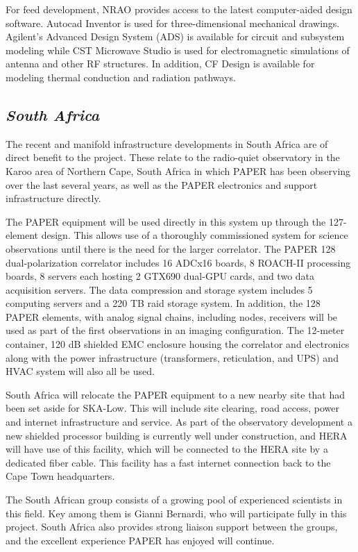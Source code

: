 \documentclass[11pt]{article}
\begin{document}
For feed development, NRAO provides access to the latest computer-aided design software. Autocad
Inventor is used for three-dimensional mechanical drawings. Agilent’s Advanced
Design System (ADS) is available for circuit and subsystem modeling while CST
Microwave Studio is used for electromagnetic simulations of antenna and other
RF structures. In addition, CF Design is available for modeling thermal
conduction and radiation pathways.

\subsection*{\it South Africa}

The recent and manifold infrastructure developments in South Africa are of
direct benefit to the project.  These relate to the radio-quiet observatory in
the Karoo area of Northern Cape, South Africa in which PAPER has been observing
over the last several years, as well as the PAPER electronics and support
infrastructure directly.

The PAPER equipment will be used directly in this system up through the
127-element design.  This allows use of a thoroughly commissioned system for
science observations until there is the need for the larger correlator.  The
PAPER 128 dual-polarization correlator includes 16 ADCx16 boards,  8 ROACH-II
processing boards, 8 servers each hosting 2 GTX690 dual-GPU cards, and two data
acquisition servers.  The data compression and storage system includes 5
computing servers and a 220 TB raid storage system.  In addition, the 128 PAPER
elements, with analog signal chains, including nodes, receivers will be used as
part of the first observations in an imaging configuration. The 12-meter
container, 120 dB shielded EMC enclosure housing the correlator and electronics
along with the power infrastructure (transformers, reticulation, and UPS) and
HVAC system will also all be used.

South Africa will relocate the PAPER equipment to a new nearby site that had
been set aside for SKA-Low.  This will include site clearing, road access,
power and internet infrastructure and service.  As part of the observatory
development a new shielded processor building is currently well under
construction, and HERA will have use of this facility, which will be connected
to the HERA site by a dedicated fiber cable.  This facility has a fast internet
connection back to the Cape Town headquarters.

The South African group consists of a growing pool of experienced scientists in
this field.  Key among them is Gianni Bernardi, who will participate fully in
this project.  South Africa also provides strong liaison support between the
groups, and the excellent experience PAPER has enjoyed will continue.
\end{document}
